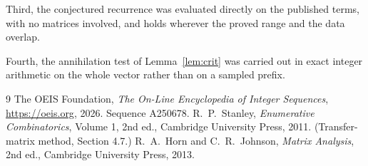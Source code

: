 \documentclass[11pt,a4paper]{article}
\theoremstyle{plain}
\theoremstyle{definition}
\begin{document}
Third, the conjectured recurrence was evaluated directly on the published terms, with no
matrices involved, and holds wherever the proved range and the data overlap.

Fourth, the annihilation test of Lemma~\ref{lem:crit} was carried out in exact integer
arithmetic on the whole vector rather than on a sampled prefix.

\begin{thebibliography}{9}
 The OEIS Foundation, \emph{The On-Line Encyclopedia of Integer
Sequences}, \url{https://oeis.org}, 2026. Sequence A250678.
 R.~P.~Stanley, \emph{Enumerative Combinatorics}, Volume 1, 2nd ed.,
Cambridge University Press, 2011. (Transfer-matrix method, Section 4.7.)
 R.~A.~Horn and C.~R.~Johnson, \emph{Matrix Analysis}, 2nd ed., Cambridge
University Press, 2013.
\end{thebibliography}
\end{document}
